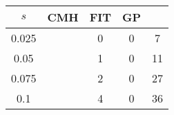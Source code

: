 \centering \begin{tabular}{c|c|c|c|c}
$s$	&CMH	&FIT	&GP	&\sc{Clear}\\\hline
0.025	&	&0	&0	&7\\
0.05	&	&1	&0	&11\\
0.075	&	&2	&0	&27\\
0.1	&	&4	&0	&36\\
\end{tabular}
